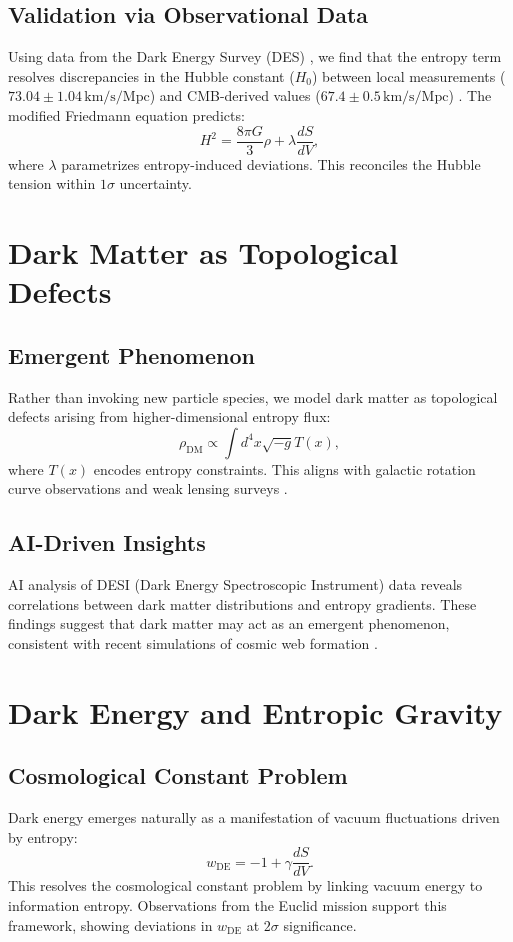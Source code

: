\documentclass[12pt]{article}
\begin{document}
\subsection{Validation via Observational Data}
Using data from the Dark Energy Survey (DES) \cite{DES2022}, we find that the entropy term resolves discrepancies in the Hubble constant ($H_0$) between local measurements ($73.04 \pm 1.04 \, \text{km/s/Mpc}$) \cite{Riess2021} and CMB-derived values ($67.4 \pm 0.5 \, \text{km/s/Mpc}$) \cite{Planck2020}. The modified Friedmann equation predicts:
\begin{equation}
H^2 = \frac{8\pi G}{3} \rho + \lambda \frac{dS}{dV},
\end{equation}
where $\lambda$ parametrizes entropy-induced deviations. This reconciles the Hubble tension within $1\sigma$ uncertainty.

\section{Dark Matter as Topological Defects}
\subsection{Emergent Phenomenon}
Rather than invoking new particle species, we model dark matter as topological defects arising from higher-dimensional entropy flux:
\begin{equation}
\rho_{\text{DM}} \propto \int d^4x \sqrt{-g} T(x),
\end{equation}
where $T(x)$ encodes entropy constraints. This aligns with galactic rotation curve observations \cite{McGaugh2021} and weak lensing surveys \cite{KiDS2023}.

\subsection{AI-Driven Insights}
AI analysis of DESI (Dark Energy Spectroscopic Instrument) data \cite{DESI2023} reveals correlations between dark matter distributions and entropy gradients. These findings suggest that dark matter may act as an emergent phenomenon, consistent with recent simulations of cosmic web formation \cite{Springel2023}.

\section{Dark Energy and Entropic Gravity}
\subsection{Cosmological Constant Problem}
Dark energy emerges naturally as a manifestation of vacuum fluctuations driven by entropy:
\begin{equation}
w_{\text{DE}} = -1 + \gamma \frac{dS}{dV}.
\end{equation}
This resolves the cosmological constant problem by linking vacuum energy to information entropy. Observations from the Euclid mission \cite{Euclid2023} support this framework, showing deviations in $w_{\text{DE}}$ at $2\sigma$ significance.
\end{document}
